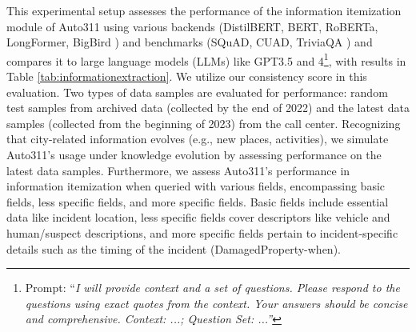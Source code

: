 This experimental setup assesses the performance of the information itemization module of Auto311 using various backends (DistilBERT, BERT, RoBERTa, LongFormer, BigBird \cite{sanh2019distilbert, beltagy2020longformer, zaheer2020big}) and benchmarks (SQuAD, CUAD, TriviaQA \cite{rajpurkar2016squad, rajpurkar2018know, hendrycks2021cuad, joshi2017triviaqa}) and compares it to large language models (LLMs) like GPT3.5 and 4\footnote{Prompt: ``\textit{I will provide context and a set of questions. Please respond to the questions using exact quotes from the context. Your answers should be concise and comprehensive. Context: ...; Question Set: ...''}}, with results in Table \ref{tab:informationextraction}. We utilize our consistency score in this evaluation. Two types of data samples are evaluated for performance: random test samples from archived data (collected by the end of 2022) and the latest data samples (collected from the beginning of 2023) from the call center. Recognizing that city-related information evolves (e.g., new places, activities), we simulate Auto311's usage under knowledge evolution by assessing performance on the latest data samples. Furthermore, we assess Auto311's performance in information itemization when queried with various fields, encompassing basic fields, less specific fields, and more specific fields. Basic fields include essential data like incident location, less specific fields cover descriptors like vehicle and human/suspect descriptions, and more specific fields pertain to incident-specific details such as the timing of the incident (DamagedProperty-when).

